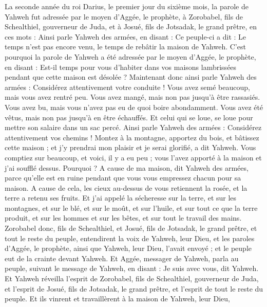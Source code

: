 \begin{multicols}{2}
\VerseOne{}La seconde année du roi Darius, le premier jour du sixième mois, la parole de Yahweh fut adressée par le moyen d'Aggée, le prophète, à Zorobabel, fils de Schealthiel, gouverneur de Juda, et à Josué, fils de Jotsadak, le grand prêtre, en ces mots :
Ainsi parle Yahweh des armées, en disant : Ce peuple-ci a dit : Le temps n'est pas encore venu, le temps de rebâtir la maison de Yahweh.
C'est pourquoi la parole de Yahweh a été adressée par le moyen d'Aggée, le prophète, en disant :
Est-il temps pour vous d'habiter dans vos maisons lambrissées pendant que cette maison est désolée ?
Maintenant donc ainsi parle Yahweh des armées : Considérez attentivement votre conduite !
Vous avez semé beaucoup, mais vous avez rentré peu. Vous avez mangé, mais non pas jusqu'à être rassasiés. Vous avez bu, mais vous n'avez pas eu de quoi boire abondamment. Vous avez été vêtus, mais non pas jusqu'à en être échauffés. Et celui qui se loue, se loue pour mettre son salaire dans un sac percé.
Ainsi parle Yahweh des armées : Considérez attentivement vos chemins !
Montez à la montagne, apportez du bois, et bâtissez cette maison ; et j'y prendrai mon plaisir et je serai glorifié, a dit Yahweh.
Vous comptiez sur beaucoup, et voici, il y a eu peu ; vous l'avez apporté à la maison et j'ai soufflé dessus. Pourquoi ? A cause de ma maison, dit Yahweh des armées, parce qu'elle est en ruine pendant que vous vous empressez chacun pour sa maison.
A cause de cela, les cieux au-dessus de vous retiennent la rosée, et la terre a retenu ses fruits.
Et j'ai appelé la sécheresse sur la terre, et sur les montagnes, et sur le blé, et sur le moût, et sur l'huile, et sur tout ce que la terre produit, et sur les hommes et sur les bêtes, et sur tout le travail des mains.
Zorobabel donc, fils de Schealthiel, et Josué, fils de Jotsadak, le grand prêtre, et tout le reste du peuple, entendirent la voix de Yahweh, leur Dieu, et les paroles d'Aggée, le prophète, ainsi que Yahweh, leur Dieu, l'avait envoyé ; et le peuple eut de la crainte devant Yahweh.
Et Aggée, messager de Yahweh, parla au peuple, suivant le message de Yahweh, en disant : Je suis avec vous, dit Yahweh.
Et Yahweh réveilla l'esprit de Zorobabel, fils de Schealthiel, gouverneur de Juda, et l'esprit de Josué, fils de Jotsadak, le grand prêtre, et l'esprit de tout le reste du peuple. Et ils vinrent et travaillèrent à la maison de Yahweh, leur Dieu,

\end{multicols}
